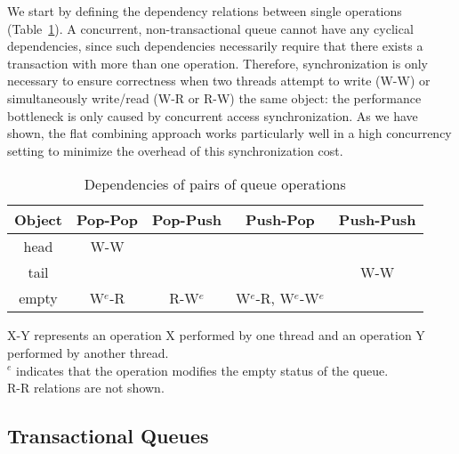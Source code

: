 We start by defining the dependency relations between single operations (Table~\ref{table:queuesimpledeps}). A concurrent, non-transactional queue cannot have any cyclical dependencies, since such dependencies necessarily require that there exists a transaction with more than one operation. Therefore, synchronization is only necessary to ensure correctness when two threads attempt to write (W-W) or simultaneously write/read (W-R or R-W) the same object: the performance bottleneck is only caused by concurrent access synchronization. As we have shown, the flat combining approach works particularly well in a high concurrency setting to minimize the overhead of this synchronization cost.

\begin{table}[h!]
    \centering
\begin{tabular}{c||c|c|c|c}
    Object & Pop-Pop & Pop-Push & Push-Pop & Push-Push\\
    \hline
    head & W-W & & & \\
    tail & & & & W-W\\
    empty & W$^e$-R & R-W$^e$ & W$^e$-R, W$^e$-W$^e$ & \\
\end{tabular}
    \caption*{X-Y represents an operation X performed by one thread and an operation Y performed by another thread.\\$^e$ indicates that the operation modifies the empty status of the queue.\\R-R relations are not shown.}
    \caption{Dependencies of pairs of queue operations}
    \label{table:queuesimpledeps}
\end{table}

\subsection{Transactional Queues}

